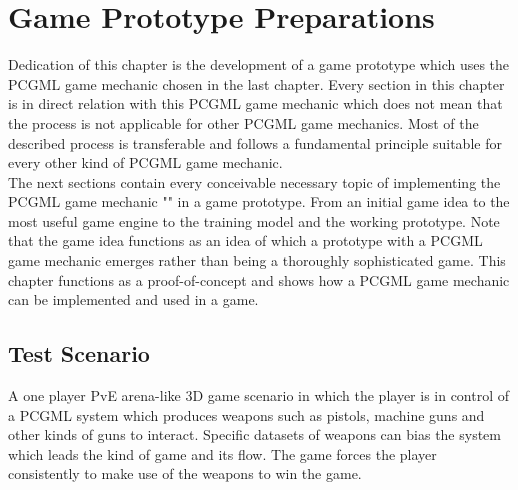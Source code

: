 \documentclass[MGS,Master,english]{twbook}%
\begin{document}
\chapter{Game Prototype Preparations} \label{chapter::gamePrototype}
Dedication of this chapter is the development of a game prototype which uses the PCGML game mechanic chosen in the last chapter. Every section in this chapter is in direct relation with this PCGML game mechanic which does not mean that the process is not applicable for other PCGML game mechanics. Most of the described process is transferable and follows a fundamental principle suitable for every other kind of PCGML game mechanic. \\
The next sections contain every conceivable necessary topic of implementing the PCGML game mechanic "" in a game prototype. From an initial game idea to the most useful game engine to the training model and the working prototype. Note that the game idea functions as an idea of which a prototype with a PCGML game mechanic emerges rather than being a thoroughly sophisticated game. This chapter functions as a proof-of-concept and shows how a PCGML game mechanic can be implemented and used in a game.

\section{Test Scenario}
A one player \ac{PvE} arena-like 3D game scenario in which the player is in control of a PCGML system which produces weapons such as pistols, machine guns and other kinds of guns to interact. Specific datasets of weapons can bias the system which leads the kind of game and its flow. The game forces the player consistently to make use of the weapons to win the game. 
\end{document}
